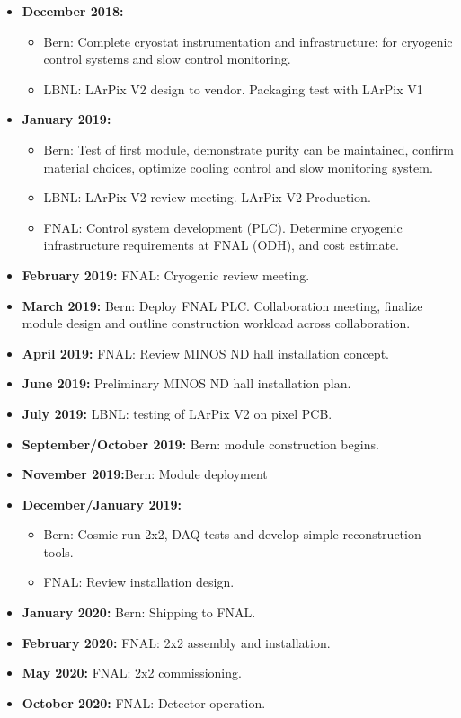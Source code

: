 \begin{itemize}
\item {\bf December 2018:}
\begin{itemize}
\item Bern: Complete cryostat instrumentation and infrastructure: for cryogenic control systems and slow control monitoring. 
\item LBNL: LArPix V2 design to vendor. Packaging test with LArPix V1
\end{itemize}
\item {\bf January 2019:} 
\begin{itemize}
	\item Bern: Test of first module, demonstrate purity can be maintained, confirm material choices, optimize cooling control and slow monitoring system.   
	\item LBNL: LArPix V2 review meeting. LArPix V2 Production.
	\item FNAL: Control system development (PLC). Determine cryogenic infrastructure requirements at FNAL (ODH), and cost estimate.  
\end{itemize}
\item {\bf February 2019:} FNAL: Cryogenic review meeting.  
\item {\bf March 2019:} Bern: Deploy FNAL PLC. Collaboration meeting, finalize module design and outline construction workload across collaboration.    
\item {\bf April 2019:} FNAL: Review MINOS ND hall installation concept.
\item {\bf June 2019:} Preliminary MINOS ND hall installation plan.
\item {\bf July 2019:} LBNL: testing of LArPix V2 on pixel PCB.
\item {\bf September/October 2019:} Bern: module construction begins.
 \item {\bf November 2019:}Bern: Module deployment 
\item {\bf December/January 2019:} 
\begin{itemize}
	\item Bern: Cosmic run  2x2, DAQ tests and develop simple reconstruction tools.   
	\item FNAL: Review installation design.  
\end{itemize}
\item {\bf January 2020:} Bern: Shipping to FNAL.
\item {\bf February 2020:} FNAL: 2x2 assembly and installation.
\item {\bf May 2020:} FNAL: 2x2 commissioning.    
\item {\bf October 2020:} FNAL: Detector operation.

\end{itemize}
